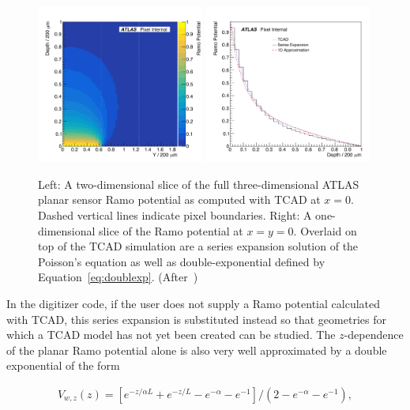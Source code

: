 \begin{figure}[!htpb]
\centering
\includegraphics[width=0.49\textwidth]{newtest_ramoxz_10.pdf}
\includegraphics[width=0.49\textwidth]{newtest_ramoz_10.pdf}
\caption{Left: A two-dimensional slice of the full three-dimensional ATLAS planar sensor Ramo potential as computed with TCAD at $x=0$.  Dashed vertical lines indicate pixel boundaries.  Right: A one-dimensional slice of the Ramo potential at $x=y=0$.  Overlaid on top of the TCAD simulation are a series expansion solution of the Poisson's equation as well as double-exponential defined by Equation~\ref{eq:doublexp}. (After~\cite{Benoit:2255825})}
\label{fig:ramo:planar}
\end{figure}

In the digitizer code, if the user does not supply a Ramo potential calculated with TCAD, this series expansion is substituted instead so that geometries for which a TCAD model has not yet been created can be studied.  The $z$-dependence of the planar Ramo potential alone is also very well approximated by a double exponential of the form 

\begin{align}
\label{eq:doublexp}
V_{w,z}(z)=[e^{-z/\alpha L}+e^{-z/L}-e^{-\alpha}-e^{-1}]/(2-e^{-\alpha}-e^{-1}),
\end{align}

